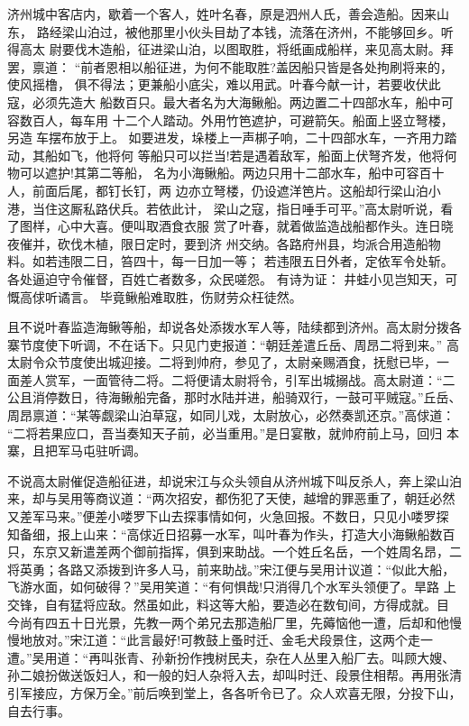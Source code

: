 济州城中客店内，歇着一个客人，姓叶名春，原是泗州人氏，善会造船。因来山东，
路经梁山泊过，被他那里小伙头目劫了本钱，流落在济州，不能够回乡。听得高太
尉要伐木造船，征进梁山泊，以图取胜，将纸画成船样，来见高太尉。拜罢，禀道：
“前者恩相以船征进，为何不能取胜?盖因船只皆是各处拘刷将来的，使风摇橹，
俱不得法；更兼船小底尖，难以用武。叶春今献一计，若要收伏此寇，必须先造大
船数百只。最大者名为大海鳅船。两边置二十四部水车，船中可容数百人，每车用
十二个人踏动。外用竹笆遮护，可避箭矢。船面上竖立弩楼，另造车摆布放于上。
如要进发，垛楼上一声梆子响，二十四部水车，一齐用力踏动，其船如飞，他将何
等船只可以拦当!若是遇着敌军，船面上伏弩齐发，他将何物可以遮护!其第二等船，
名为小海鳅船。两边只用十二部水车，船中可容百十人，前面后尾，都钉长钉，两
边亦立弩楼，仍设遮洋笆片。这船却行梁山泊小港，当住这厮私路伏兵。若依此计，
梁山之寇，指日唾手可平。”高太尉听说，看了图样，心中大喜。便叫取酒食衣服
赏了叶春，就着做监造战船都作头。连日晓夜催并，砍伐木植，限日定时，要到济
州交纳。各路府州县，均派合用造船物料。如若违限二日，笞四十，每一日加一等；
若违限五日外者，定依军令处斩。各处逼迫守令催督，百姓亡者数多，众民嗟怨。
有诗为证：
井蛙小见岂知天，可慨高俅听谲言。
毕竟鳅船难取胜，伤财劳众枉徒然。

且不说叶春监造海鳅等船，却说各处添拨水军人等，陆续都到济州。高太尉分拨各
寨节度使下听调，不在话下。只见门吏报道：“朝廷差遣丘岳、周昂二将到来。”
高太尉令众节度使出城迎接。二将到帅府，参见了，太尉亲赐酒食，抚慰已毕，一
面差人赏军，一面管待二将。二将便请太尉将令，引军出城搦战。高太尉道：“二
公且消停数日，待海鳅船完备，那时水陆并进，船骑双行，一鼓可平贼寇。”丘岳、
周昂禀道：“某等觑梁山泊草寇，如同儿戏，太尉放心，必然奏凯还京。”高俅道：
“二将若果应口，吾当奏知天子前，必当重用。”是日宴散，就帅府前上马，回归
本寨，且把军马屯驻听调。

不说高太尉催促造船征进，却说宋江与众头领自从济州城下叫反杀人，奔上梁山泊
来，却与吴用等商议道：“两次招安，都伤犯了天使，越增的罪恶重了，朝廷必然
又差军马来。”便差小喽罗下山去探事情如何，火急回报。不数日，只见小喽罗探
知备细，报上山来：“高俅近日招募一水军，叫叶春为作头，打造大小海鳅船数百
只，东京又新遣差两个御前指挥，俱到来助战。一个姓丘名岳，一个姓周名昂，二
将英勇；各路又添拨到许多人马，前来助战。”宋江便与吴用计议道：“似此大船，
飞游水面，如何破得？”吴用笑道：“有何惧哉!只消得几个水军头领便了。旱路
上交锋，自有猛将应敌。然虽如此，料这等大船，要造必在数旬间，方得成就。目
今尚有四五十日光景，先教一两个弟兄去那造船厂里，先薅恼他一遭，后却和他慢
慢地放对。”宋江道：“此言最好!可教鼓上蚤时迁、金毛犬段景住，这两个走一
遭。”吴用道：“再叫张青、孙新扮作拽树民夫，杂在人丛里入船厂去。叫顾大嫂、
孙二娘扮做送饭妇人，和一般的妇人杂将入去，却叫时迁、段景住相帮。再用张清
引军接应，方保万全。”前后唤到堂上，各各听令已了。众人欢喜无限，分投下山，
自去行事。

